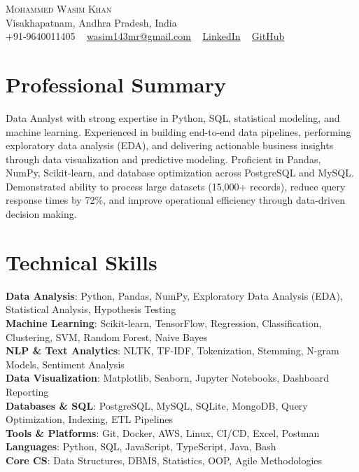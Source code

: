 \documentclass[letterpaper,11pt]{article}
\begin{document}
\begin{center}
  {\Huge \scshape Mohammed Wasim Khan} \\ \vspace{1pt}
  Visakhapatnam, Andhra Pradesh, India \\ \vspace{1pt}
  \small +91-9640011405 ~
  \href{mailto:wasim143mr@gmail.com}{wasim143mr@gmail.com} ~
  \href{https://linkedin.com/in/mohammed-wasim-khan-757595245}{LinkedIn} ~
  \href{https://github.com/wasim-builds}{GitHub}
  \vspace{-8pt}
\end{center}

\section{Professional Summary}
Data Analyst with strong expertise in Python, SQL, statistical modeling, and machine learning. Experienced in building end-to-end data pipelines, performing exploratory data analysis (EDA), and delivering actionable business insights through data visualization and predictive modeling. Proficient in Pandas, NumPy, Scikit-learn, and database optimization across PostgreSQL and MySQL. Demonstrated ability to process large datasets (15,000+ records), reduce query response times by 72\%, and improve operational efficiency through data-driven decision making.

\section{Technical Skills}
\begin{itemize}[leftmargin=0.15in, label={}]
  \small{\item{
    \textbf{Data Analysis}{: Python, Pandas, NumPy, Exploratory Data Analysis (EDA), Statistical Analysis, Hypothesis Testing} \\
    \textbf{Machine Learning}{: Scikit-learn, TensorFlow, Regression, Classification, Clustering, SVM, Random Forest, Naive Bayes} \\
    \textbf{NLP \& Text Analytics}{: NLTK, TF-IDF, Tokenization, Stemming, N-gram Models, Sentiment Analysis} \\
    \textbf{Data Visualization}{: Matplotlib, Seaborn, Jupyter Notebooks, Dashboard Reporting} \\
    \textbf{Databases \& SQL}{: PostgreSQL, MySQL, SQLite, MongoDB, Query Optimization, Indexing, ETL Pipelines} \\
    \textbf{Tools \& Platforms}{: Git, Docker, AWS, Linux, CI/CD, Excel, Postman} \\
    \textbf{Languages}{: Python, SQL, JavaScript, TypeScript, Java, Bash} \\
    \textbf{Core CS}{: Data Structures, DBMS, Statistics, OOP, Agile Methodologies}
  }}
\end{itemize}
\vspace{-16pt}
\end{document}
